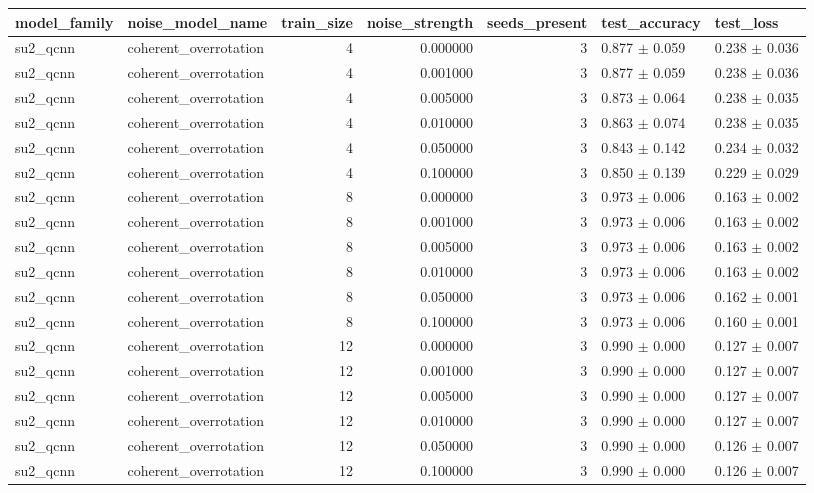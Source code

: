 \begin{tabular}{llrrrll}
\toprule
model_family & noise_model_name & train_size & noise_strength & seeds_present & test_accuracy & test_loss \\
\midrule
su2_qcnn & coherent_overrotation & 4 & 0.000000 & 3 & 0.877 $\pm$ 0.059 & 0.238 $\pm$ 0.036 \\
su2_qcnn & coherent_overrotation & 4 & 0.001000 & 3 & 0.877 $\pm$ 0.059 & 0.238 $\pm$ 0.036 \\
su2_qcnn & coherent_overrotation & 4 & 0.005000 & 3 & 0.873 $\pm$ 0.064 & 0.238 $\pm$ 0.035 \\
su2_qcnn & coherent_overrotation & 4 & 0.010000 & 3 & 0.863 $\pm$ 0.074 & 0.238 $\pm$ 0.035 \\
su2_qcnn & coherent_overrotation & 4 & 0.050000 & 3 & 0.843 $\pm$ 0.142 & 0.234 $\pm$ 0.032 \\
su2_qcnn & coherent_overrotation & 4 & 0.100000 & 3 & 0.850 $\pm$ 0.139 & 0.229 $\pm$ 0.029 \\
su2_qcnn & coherent_overrotation & 8 & 0.000000 & 3 & 0.973 $\pm$ 0.006 & 0.163 $\pm$ 0.002 \\
su2_qcnn & coherent_overrotation & 8 & 0.001000 & 3 & 0.973 $\pm$ 0.006 & 0.163 $\pm$ 0.002 \\
su2_qcnn & coherent_overrotation & 8 & 0.005000 & 3 & 0.973 $\pm$ 0.006 & 0.163 $\pm$ 0.002 \\
su2_qcnn & coherent_overrotation & 8 & 0.010000 & 3 & 0.973 $\pm$ 0.006 & 0.163 $\pm$ 0.002 \\
su2_qcnn & coherent_overrotation & 8 & 0.050000 & 3 & 0.973 $\pm$ 0.006 & 0.162 $\pm$ 0.001 \\
su2_qcnn & coherent_overrotation & 8 & 0.100000 & 3 & 0.973 $\pm$ 0.006 & 0.160 $\pm$ 0.001 \\
su2_qcnn & coherent_overrotation & 12 & 0.000000 & 3 & 0.990 $\pm$ 0.000 & 0.127 $\pm$ 0.007 \\
su2_qcnn & coherent_overrotation & 12 & 0.001000 & 3 & 0.990 $\pm$ 0.000 & 0.127 $\pm$ 0.007 \\
su2_qcnn & coherent_overrotation & 12 & 0.005000 & 3 & 0.990 $\pm$ 0.000 & 0.127 $\pm$ 0.007 \\
su2_qcnn & coherent_overrotation & 12 & 0.010000 & 3 & 0.990 $\pm$ 0.000 & 0.127 $\pm$ 0.007 \\
su2_qcnn & coherent_overrotation & 12 & 0.050000 & 3 & 0.990 $\pm$ 0.000 & 0.126 $\pm$ 0.007 \\
su2_qcnn & coherent_overrotation & 12 & 0.100000 & 3 & 0.990 $\pm$ 0.000 & 0.126 $\pm$ 0.007 \\

\end{tabular}
